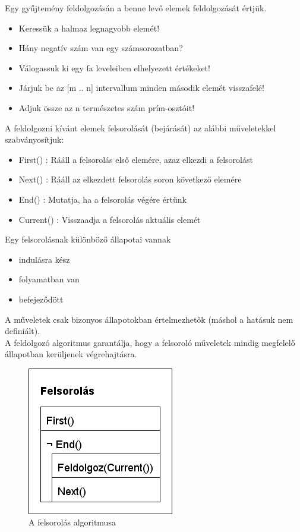 \documentclass[12pt,margin=0px]{article}
\begin{document}
	\noindent Egy gyűjtemény feldolgozásán a benne levő elemek
	feldolgozását értjük.
    {\color{mygray}
	\begin{itemize}
		\item	Keressük a halmaz legnagyobb elemét!
		\item	Hány negatív szám van egy számsorozatban?
		\item	Válogassuk ki egy fa leveleiben elhelyezett értékeket!
		\item	Járjuk be az [m .. n] intervallum minden második elemét visszafelé!
		\item	Adjuk össze az n természetes szám prím-osztóit!
	\end{itemize}
    }
	
	\noindent A feldolgozni kívánt elemek felsorolását (bejárását) az alábbi
	műveletekkel szabványosítjuk:
	\begin{itemize}
		\item	First() : Rááll a felsorolás első elemére, azaz elkezdi a felsorolást
		\item	Next() : Rááll az elkezdett felsorolás soron következő elemére
		\item	End() : Mutatja, ha a felsorolás végére értünk
		\item	Current() : Visszaadja a felsorolás aktuális elemét\\
	\end{itemize}
	
    \noindent Egy felsorolásnak különböző állapotai vannak
    \begin{itemize}
        \item indulásra kész
        \item folyamatban van
        \item befejeződött\\
    \end{itemize}

    \noindent A műveletek csak bizonyos állapotokban értelmezhetők (máshol a hatásuk nem definiált). \\

	\noindent A feldolgozó algoritmus garantálja, hogy a felsoroló műveletek mindig megfelelő állapotban kerüljenek	végrehajtásra.

	\begin{figure}[H]
		\centering
		\includegraphics[width=0.3\linewidth]{img/felsorolas_stuki}
		\caption{A felsorolás algoritmusa}
		\label{fig:felsorolas_stuki}
	\end{figure}
	
\end{document}
